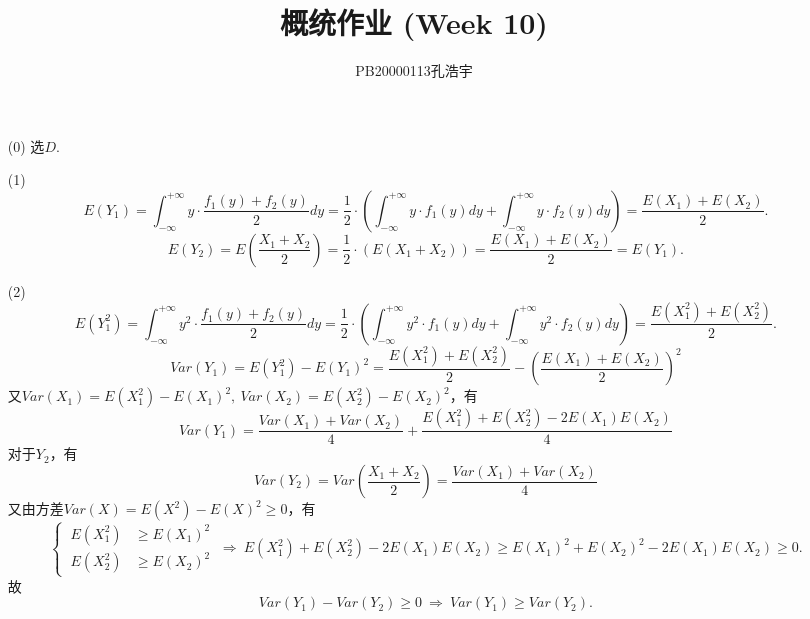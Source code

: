 \documentclass{article}
\title{概统作业 (Week 10)}
\author{PB20000113孔浩宇}
\begin{document}
\maketitle
\section{}  %
\begin{enumerate}
    \item [(0)]选$D$.
    \item [(1)]
    \[
        E(Y_1) 
        = \int_{-\infty}^{+\infty} y \cdot \frac{f_{1} (y)+f_{2} (y)}{2} dy
        = \frac{1}{2}\cdot \left(\int_{-\infty}^{+\infty} y \cdot f_{1} (y) dy + \int_{-\infty}^{+\infty} y \cdot f_{2} (y) dy\right)
        = \frac{E(X_1) + E(X_2)}{2}.
    \]
    \[
        E(Y_2)
        = E\left(\frac{X_1 + X_2}{2}\right)
        = \frac{1}{2}\cdot \left(E(X_1 + X_2)\right)  
        = \frac{E(X_1) + E(X_2)}{2}
        = E(Y_1) .
    \]
    \item [(2)]
    \[
        E(Y_1^2)
        = \int_{-\infty}^{+\infty} y^2 \cdot \frac{f_{1} (y)+f_{2} (y)}{2} dy
        = \frac{1}{2}\cdot \left(\int_{-\infty}^{+\infty} y^2 \cdot f_{1} (y) dy + \int_{-\infty}^{+\infty} y^2 \cdot f_{2} (y) dy\right)
        = \frac{E(X_1^2) + E(X_2^2)}{2}.    
    \]
    \[
        Var(Y_1)
        = E(Y_1^2) - {E(Y_1)}^2   
        = \frac{E(X_1^2) + E(X_2^2)}{2} - {\left(\frac{E(X_1) + E(X_2)}{2}\right)}^2
    \]
    又$Var(X_1) = E(X_1^2) - {E(X_1)}^2,\ Var(X_2) = E(X_2^2) - {E(X_2)}^2$，有
    \[
        Var(Y_1)
        = \frac{Var(X_1) + Var(X_2)}{4} + \frac{E(X_1^2) + E(X_2^2) - 2 E(X_1)E(X_2)}{4}
    \]
    对于$Y_2$，有
    \[
        Var(Y_2)   
        = Var\left(\frac{X_1 + X_2}{2}\right) 
        = \frac{Var(X_1) + Var(X_2)}{4}
    \]
    又由方差$Var(X) = E(X^2) - {E(X)}^2\geq 0$，有
    \[
        \begin{cases}
            \ E(X_1^2) &\geq {E(X_1)}^2 \\ 
            \ E(X_2^2) &\geq {E(X_2)}^2 
        \end{cases}
        \ \Rightarrow\ 
        E(X_1^2) + E(X_2^2) - 2 E(X_1)E(X_2)
        \geq {E(X_1)}^2 + {E(X_2)}^2 - 2 E(X_1)E(X_2)
        \geq 0.
    \]
    故
    \[
        Var(Y_1) - Var(Y_2) \geq 0
        \ \Rightarrow\ 
        Var(Y_1) \geq Var(Y_2).
    \]
\end{enumerate}
\end{document}

